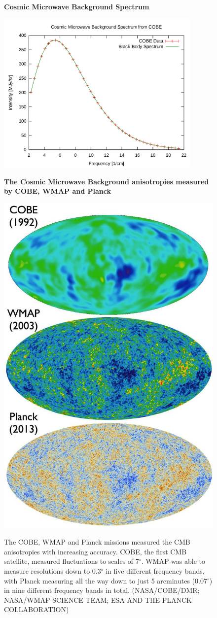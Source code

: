 \documentclass{article}
\begin{document}
\begin{figure}
\centering
    \textbf{Cosmic Microwave Background  Spectrum}\par\medskip
\centering
   {\includegraphics[height=8cm]{blackbody}}
\caption{}
\label{cobe_blackbody}
\end{figure}


\begin{figure}
\centering
    \textbf{The Cosmic Microwave Background anisotropies measured by COBE, WMAP and Planck}\par\medskip
\centering
   {\includegraphics[width=.45\textwidth]{cobe_wmap_planck.jpg}}


\caption{The COBE, WMAP and Planck missions measured the CMB anisotropies with increasing accuracy. COBE, the first CMB satellite, measured fluctuations to scales of 7$^\circ$. WMAP was able to measure resolutions down to 0.3$^\circ$ in five different frequency bands, with Planck measuring all the way down to just 5 arcminutes (0.07$^\circ$) in nine different frequency bands in total.  (NASA/COBE/DMR; NASA/WMAP SCIENCE TEAM; ESA AND THE PLANCK COLLABORATION)}
\label{cobe_wmap_planck}
\end{figure}
\end{document}
